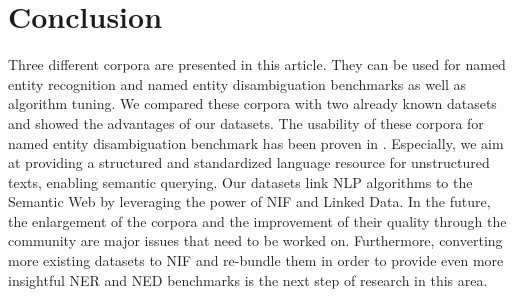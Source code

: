 \section{Conclusion}

Three different corpora are presented in this article. They can be used for named entity recognition and named entity disambiguation benchmarks as well as algorithm tuning.
We compared these corpora with two already known datasets and showed the advantages of our datasets.
The usability of these corpora for named entity disambiguation benchmark has been proven in \cite{agdistis_iswc,GER+13}.
Especially, we aim at providing a structured and standardized language resource for unstructured texts, enabling semantic querying.
Our datasets link NLP algorithms to the Semantic Web by leveraging the power of NIF and Linked Data.
In the future, the enlargement of the corpora and the improvement of their quality through the community are major issues that need to be worked on. 
Furthermore, converting more existing datasets to NIF and re-bundle them in order to provide even more insightful NER and NED benchmarks is the next step of research in this area.

